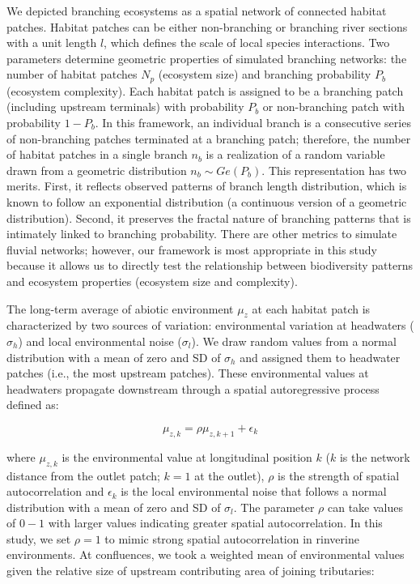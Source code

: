 \documentclass[
]{article}
\begin{document}
We depicted branching ecosystems as a spatial network of connected
habitat patches. Habitat patches can be either non-branching or
branching river sections with a unit length \(l\), which defines the
scale of local species interactions. Two parameters determine geometric
properties of simulated branching networks: the number of habitat
patches \(N_p\) (ecosystem size) and branching probability \(P_b\)
(ecosystem complexity). Each habitat patch is assigned to be a branching
patch (including upstream terminals) with probability \(P_b\) or
non-branching patch with probability \(1-P_b\). In this framework, an
individual branch is a consecutive series of non-branching patches
terminated at a branching patch; therefore, the number of habitat
patches in a single branch \(n_b\) is a realization of a random variable
drawn from a geometric distribution \(n_{b} \sim Ge(P_{b})\). This
representation has two merits. First, it reflects observed patterns of
branch length distribution, which is known to follow an exponential
distribution (a continuous version of a geometric distribution). Second,
it preserves the fractal nature of branching patterns that is intimately
linked to branching probability. There are other metrics to simulate
fluvial networks; however, our framework is most appropriate in this
study because it allows us to directly test the relationship between
biodiversity patterns and ecosystem properties (ecosystem size and
complexity).

The long-term average of abiotic environment \(\mu_z\) at each habitat
patch is characterized by two sources of variation: environmental
variation at headwaters (\(\sigma_h\)) and local environmental noise
(\(\sigma_l\)). We draw random values from a normal distribution with a
mean of zero and SD of \(\sigma_{h}\) and assigned them to headwater
patches (i.e., the most upstream patches). These environmental values at
headwaters propagate downstream through a spatial autoregressive process
defined as:

\[
\mu_{z,k} = \rho \mu_{z,k+1} + \epsilon_{k}
\]

where \(\mu_{z,k}\) is the environmental value at longitudinal position
\(k\) (\(k\) is the network distance from the outlet patch; \(k = 1\) at
the outlet), \(\rho\) is the strength of spatial autocorrelation and
\(\epsilon_k\) is the local environmental noise that follows a normal
distribution with a mean of zero and SD of \(\sigma_l\). The parameter
\(\rho\) can take values of \(0-1\) with larger values indicating
greater spatial autocorrelation. In this study, we set \(\rho = 1\) to
mimic strong spatial autocorrelation in rinverine environments. At
confluences, we took a weighted mean of environmental values given the
relative size of upstream contributing area of joining tributaries:
\end{document}
